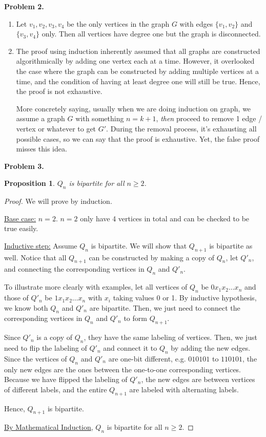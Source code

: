 \documentclass{article}
\newtheorem{prop}[thm]{Proposition}
\begin{document}
\textbf{Problem 2.}
\begin{enumerate}[label=(\alph*)]
    \item Let $v_1, v_2, v_3, v_4$ be the only vertices in the graph $G$ with edges $\{v_1, v_2\}$ and $\{v_3, v_4\}$ only.
    Then all vertices have degree one but the graph is disconnected.

    \item
    The proof using induction inherently assumed that all graphs are constructed algorithmically by adding one vertex each at a time. 
    However, it overlooked the case where the graph can be constructed by adding multiple vertices at a time, and the condition of having at least degree one will still be true.
    Hence, the proof is not exhaustive.

    More concretely saying, usually when we are doing induction on graph, we assume a graph $G$ with something $n=k+1$, \emph{then} proceed to remove 1 edge / vertex or whatever to get $G'$.
    During the removal process, it's exhausting all possible cases, so we can say that the proof is exhaustive.
    Yet, the false proof misses this idea.
\end{enumerate}
\bigbreak

\textbf{Problem 3.}

\begin{prop}
    $Q_n$ is bipartite for all $n \geq 2$.
\end{prop}
\begin{proof}
    We will prove by induction.

    \underline{Base case:} $n = 2$. $n=2$ only have 4 vertices in total and can be checked to be true easily.

    \underline{Inductive step:} Assume $Q_n$ is bipartite. We will show that $Q_{n+1}$ is bipartite as well.
    Notice that all $Q_{n+1}$ can be constructed by making a copy of $Q_n$, let $Q'_n$, and connecting the corresponding vertices in $Q_n$ and $Q'_n$.

    To illustrate more clearly with examples, let all vertices of $Q_n$ be $0x_1x_2\dots x_n$ and those of $Q'_n$ be $1x_1x_2\dots x_n$ with $x_i$ taking values 0 or 1.
    By inductive hypothesis, we know both $Q_n$ and $Q'_n$ are bipartite. Then, we just need to connect the corresponding vertices in $Q_n$ and $Q'_n$ to form $Q_{n+1}$.

    Since $Q'_n$ is a copy of $Q_n$, they have the same labeling of vertices. 
    Then, we just need to flip the labeling of $Q'_n$ and connect it to $Q_n$ by adding the new edges. 
    Since the vertices of $Q_n$ and $Q'_n$ are one-bit different, e.g. $010101$ to $110101$, the only new edges are the ones between the one-to-one corresponding vertices.
    Because we have flipped the labeling of $Q'_n$, the new edges are between vertices of different labels, and the entire $Q_{n+1}$ are labeled with alternating labels.

    Hence, $Q_{n+1}$ is bipartite.

    \underline{By Mathematical Induction}, $Q_n$ is bipartite for all $n \geq 2$.
\end{proof}
\bigbreak
\end{document}

